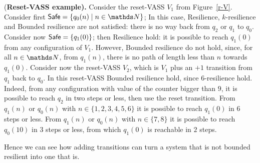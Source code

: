\begin{example}\label{Example}
{(\bf Reset-VASS example).}
Consider the %
 reset-VASS $V_1$ from Figure~\ref{r-V}.
Consider first $\Safe = \{q_0(n) \mid n \in \N\}$; In this case,  {Resilience},  { $k$-resilience} and { Bounded resilience} are not satisfied: there is no  way back from $q_2$ or $q_1$ to $q_0$. Consider now $\textsf{Safe} = \{q_1(0)\} $; then { Resilience} hold: it is possible to reach $q_1(0)$ from any configuration of $V_1$. However, { Bounded resilience} do not hold, since, for all $n\in \N$, from $q_1(n)$, there is no path of length less than $n$ towards $q_1(0)$. Consider now the %
 reset-VASS $V_2$, which is $V_1$ plus an $+1$ transition from $q_1$ back to $q_0$. In this reset-VASS { Bounded resilience} hold, since $6$-resilience hold. 
Indeed, from any configuration with value of the counter bigger than $9$, it is possible to reach $q_2$ in two steps or less, then use the reset transition. From $q_1(n)$ or $q_0(n)$ with $n \in \{1, 2, 3, 4, 5, 6\}$ it is possible to reach $q_1(0)$ in $6$ steps or less. From 
$q_1(n)$ or $q_0(n)$ with $n \in \{7,8\}$ it is possible to reach $q_0(10)$ in $3$ steps or less, from which $q_1(0)$ is reachable in $2$ steps. 
\end{example}

Hence we can see how adding transitions can 
turn a system that is not bounded resilient into one that is. 

